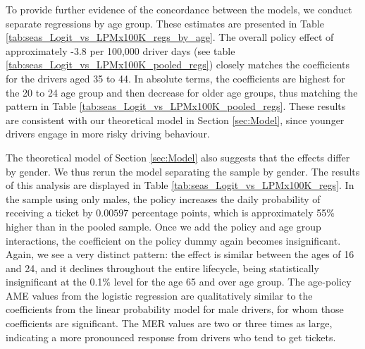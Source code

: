 To provide further evidence of the concordance between the models, 
we conduct separate regressions by age group. 
These estimates are presented in 
Table \ref{tab:seas_Logit_vs_LPMx100K_regs_by_age}. 
The overall policy effect of approximately -3.8 per 100,000 driver days (see table \ref{tab:seas_Logit_vs_LPMx100K_pooled_regs}) 
closely matches the coefficients for the drivers aged 35 to 44. 
In absolute terms, the coefficients are highest for the 20 to 24 age group and then decrease for older age groups, thus
matching the pattern in Table \ref{tab:seas_Logit_vs_LPMx100K_pooled_regs}. 
These results are consistent 
with our theoretical model in Section \ref{sec:Model}, 
since younger drivers engage in more risky driving behaviour. 



The theoretical model of Section \ref{sec:Model} 
also suggests that the effects differ by gender. 
We thus rerun the model separating the sample by gender. 
The results of this analysis are displayed in 
Table \ref{tab:seas_Logit_vs_LPMx100K_regs}.
In the sample using only males, 
the policy increases the daily probability of receiving a ticket by $0.00597$ 
percentage points, which is approximately 55\% higher than in the pooled sample. 
Once we add the policy and age group interactions, 
the coefficient on the policy dummy again becomes insignificant. 
Again, we see a very distinct pattern: 
the effect is similar between the ages of 16 and 24, 
and it declines throughout the entire lifecycle, being statistically insignificant at the 0.1\% level for the age 65 and over age group.
% 
The age-policy AME values from the logistic regression 
are qualitatively similar to the coefficients from the linear probability model for male drivers, 
for whom those coefficients are significant. 
The MER values are two or three times as large, 
indicating a more pronounced response from drivers who tend to get tickets. 

